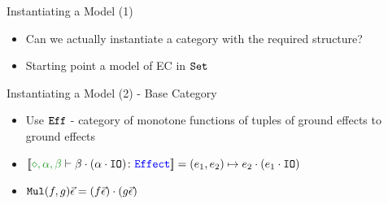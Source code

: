\documentclass{beamer}
\newcommand\script[1]{}
\begin{document}
\begin{frame}{Instantiating a Model (1)}

    \begin{itemize}
        \item Can we actually instantiate a category with the required structure? 
        \item Starting point a model of EC in $\texttt{Set}$
    \end{itemize}
    
    \script{
        - So far, we've only said what structures are required to model PEC.
        - Haven't shown that there actually exists an indexed category with the required properties
        - so let's do that
        - It's fairly well known that you can instantiate models of languages with the same features as EC in the category of sets and functions
        - We want to extend one of these models into one for PEC
    }
\end{frame}

\begin{frame}{Instantiating a Model (2) - Base Category}
\begin{itemize}
    \item Use $\texttt{Eff}$ - category of monotone functions of tuples of ground effects to ground effects
    \item $\deno{\typerelation{\nil,\a, \b}{\b\dot(\a\dot\texttt{IO})}{\effect}} = (e_1, e_2)\mapsto e_2\dot(e_1\dot\texttt{IO})$
    \item $\texttt{Mul}(f, g)\vec{\epsilon} = (f\vec{\epsilon})\cdot(g\vec{\epsilon}) $
\end{itemize}

    \script{
        - Firstly, we want to build a base category
        - to do this, we shall consider the category of monotone functions taking vectors of ground effects and returning ground effects
        - We construct the multiplication operator using the $\dot$ monoid operator from the EC spec
    }
\end{frame}
\end{document}
